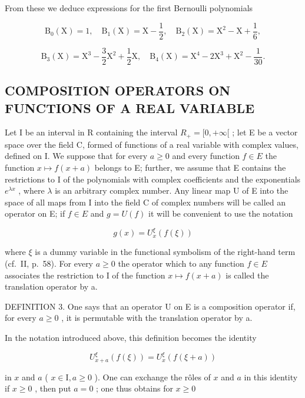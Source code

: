 From these we deduce expressions for the first Bernoulli polynomials

\[
\mathrm{B} _ {0} (\mathrm{X}) = 1, \quad \mathrm{B} _ {1} (\mathrm{X}) = \mathrm{X} - \frac {1}{2}, \quad \mathrm{B} _ {2} (\mathrm{X}) = \mathrm{X} ^ {2} - \mathrm{X} + \frac {1}{6},
\]

\[
\mathrm{B} _ {3} (\mathrm{X}) = \mathrm{X} ^ {3} - \frac {3}{2} \mathrm{X} ^ {2} + \frac {1}{2} \mathrm{X}, \quad \mathrm{B} _ {4} (\mathrm{X}) = \mathrm{X} ^ {4} - 2 \mathrm{X} ^ {3} + \mathrm{X} ^ {2} - \frac {1}{3 0}.
\]

\subsection{COMPOSITION OPERATORS ON FUNCTIONS OF A REAL VARIABLE}

Let I be an interval in R containing the interval \(R_{+} = [0, +\infty[\) ; let E be a vector space over the field C, formed of functions of a real variable with complex values, defined on I. We suppose that for every \(a \geqslant 0\) and every function \(f \in E\) the function \(x \mapsto f(x + a)\) belongs to E; further, we assume that E contains the restrictions to I of the polynomials with complex coefficients and the exponentials \(e^{\lambda x}\) , where \(\lambda\) is an arbitrary complex number. Any linear map U of E into the space of all maps from I into the field C of complex numbers will be called an operator on E; if \(f \in E\) and \(g = U(f)\) it will be convenient to use the notation

\[
g (x) = U _ {x} ^ {\xi} \left(f (\xi)\right)
\]

where \(\xi\) is a dummy variable in the functional symbolism of the right-hand term (cf.~II, p.~58). For every \(a \geqslant 0\) the operator which to any function \(f \in E\) associates the restriction to I of the function \(x \mapsto f(x + a)\) is called the translation operator by a.

DEFINITION 3. One says that an operator U on E is a composition operator if, for every \(a \geqslant 0\) , it is permutable with the translation operator by a.

In the notation introduced above, this definition becomes the identity

\[
U _ {x + a} ^ {\xi} (f (\xi)) = U _ {x} ^ {\xi} (f (\xi + a))\tag{25}
\]

in \(x\) and \(a\) ( \(x \in \mathrm{I}, a \geqslant 0\) ). One can exchange the rôles of \(x\) and \(a\) in this identity if \(x \geqslant 0\) , then put \(a = 0\) ; one thus obtains for \(x \geqslant 0\)

